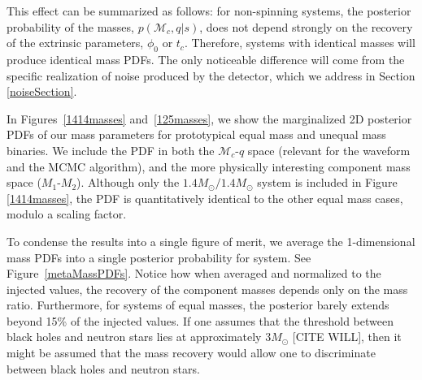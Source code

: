 \documentclass[11pt,a4paper]{emulateapj}
\newcommand{\carl}[1]{{\color{red}  #1}}
\newcommand{\chmass}{\mathcal{M}_c}
\begin{document}
This effect can be summarized as follows: for non-spinning systems, the posterior probability of the masses,
$p(\chmass, q | s)$, does not depend strongly on the recovery of the extrinsic parameters, $\phi_0$ or $t_c$.  Therefore, 
systems with identical masses will produce identical mass PDFs.  The only noticeable difference will come from
 the specific realization of noise produced by the detector, which we address in Section \ref{noiseSection}.




In Figures~\ref{1414masses} and~\ref{125masses}, we show the marginalized 2D posterior PDFs of our
 mass parameters for  prototypical equal mass and unequal mass binaries.  We include the PDF in both
  the $\chmass$-$q$ space (relevant for the waveform and the MCMC algorithm), and the more physically 
  interesting component mass space ($M_1$-$M_2$).  Although only the $1.4M_{\odot}/1.4M_{\odot}$ system
   is included in Figure \ref{1414masses}, the PDF is quantitatively identical to the other equal mass cases, 
   modulo a scaling factor. 

To condense the results into a single figure of merit, we average the 1-dimensional mass PDFs into a single 
posterior probability for system.  See Figure~\ref{metaMassPDFs}.  Notice how when averaged and
 normalized to the injected values, the recovery of the component masses depends only on the mass ratio.  
 Furthermore, for systems of equal masses, the posterior barely extends beyond 15\% of the injected values.  
 If one assumes that the threshold between black
   holes and neutron stars lies at approximately $3M_{\odot}$ \carl{[CITE WILL]}, then it might be assumed that
   the mass recovery would allow one to discriminate between black holes and neutron stars.
   
\end{document}
